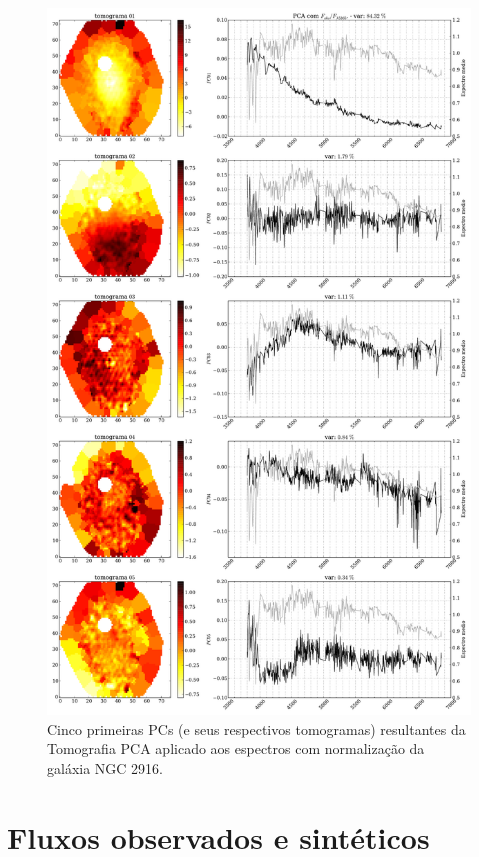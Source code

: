 \begin{figure}
    \includegraphics[height=1.\textheight]{figuras/K0277-tomo-obs-norm.pdf}
    \caption[Tomogramas de 1 a 5 da gal\'axia NGC 2916 - $F_{obs} / F_{\lambda 5365}$.]
    {Cinco primeiras PCs (e seus respectivos tomogramas) resultantes da Tomografia PCA aplicado aos espectros com
    normalização da galáxia NGC 2916.}
    \label{fig:UsoPCA:K277tomofobsnorm}
\end{figure}

\section{Fluxos observados e sintéticos}
\label{sec:UsoPCA:OBSxSYN}

